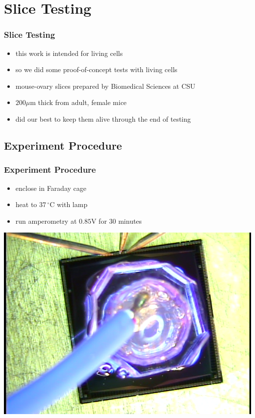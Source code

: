 \documentclass[10pt]{beamer}
\begin{document}
\section{Slice Testing}
\begin{frame}
	\frametitle{Slice Testing}
	\begin{itemize}
		\item this work is intended for living cells
		\item so we did some proof-of-concept tests with living cells
		\item mouse-ovary slices prepared by Biomedical Sciences at CSU
		\item $200 \mu \mathrm{m}$ thick from adult, female mice
		\item did our best to keep them alive through the end of testing
	\end{itemize}
\end{frame}

\subsection{Experiment Procedure}
\begin{frame}
	\frametitle{Experiment Procedure}
	\begin{itemize}
		\item enclose in Faraday cage
		\item heat to $37\,^{\circ}\mathrm{C}$ with lamp
		\item run amperometry at $0.85 \mathrm{V}$ for 30 minutes
	\end{itemize}
	\includegraphics[width=0.7\linewidth]{figures/slice-top.png}
\end{frame}
\end{document}
